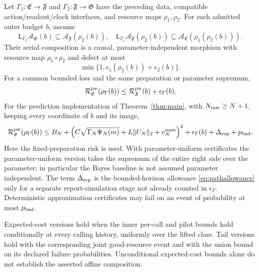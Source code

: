 \begin{theorem}\label{thm:morphism}
Let $\Gamma_1:\mathfrak E\to\mathfrak F$ and $\Gamma_2:\mathfrak F\to\mathfrak G$ have the preceding data, compatible action/readout/clock interfaces, and resource maps $\rho_1,\rho_2$. For each admitted outer budget $b$, assume
\[
 \mathsf L_{\Gamma_2}\mathcal A_{\mathfrak G}(b)
       \subseteq\mathcal A_{\mathfrak F}(\rho_2(b)),
 \quad
 \mathsf L_{\Gamma_1}\mathcal A_{\mathfrak F}(\rho_2(b))
       \subseteq\mathcal A_{\mathfrak E}(\rho_1(\rho_2(b))).
\]
Their serial composition is a causal, parameter-independent morphism with resource map $\rho_1\circ\rho_2$ and defect at most
\[
 \min\{1,\epsilon_1(\rho_2(b))+\epsilon_2(b)\}.
\]
For a common bounded loss and the same preparation or parameter supremum,
\begin{equation}\label{eq:risktransfer}
 \mathcal R^{\rm pw}_{\mathfrak E}(\rho_\Gamma(b))
       \le\mathcal R^{\rm pw}_{\mathfrak F}(b)+\epsilon_\Gamma(b).
\end{equation}
For the prediction implementation of Theorem~\ref{thm:main}, with $N_{\rm raw}\ge N+1$, keeping every coordinate of $b$ and its image,
\begin{equation}\label{eq:joint}
 \mathcal R^{\rm pw}_{\mathfrak E}(\rho_\Gamma(b))
 \le B_N+\left(C\sqrt{\Gamma_N\Psi_N(m)}
       +L\|U_N\|_2+v_N^{\rm num}\right)^2
       +\epsilon_\Gamma(b)+\Delta_{\rm rep}+p_{\rm bad}.
\end{equation}
Here the fixed-preparation risk is used. With parameter-uniform certificates the parameter-uniform version takes the supremum of the entire right side over the parameter; in particular the Bayes baseline is not assumed parameter independent. The term $\Delta_{\rm rep}$ is the bounded-horizon allowance \eqref{eq:pathallowance} only for a separate report-simulation stage not already counted in $\epsilon_\Gamma$. Deterministic approximation certificates may fail on an event of probability at most $p_{\rm bad}$.

Expected-cost versions hold when the inner per-call and pilot bounds hold conditionally at every calling history, uniformly over the lifted class. Tail versions hold with the corresponding joint good-resource event and with the union bound on its declared failure probabilities. Unconditional expected-cost bounds alone do not establish the asserted affine composition.
\end{theorem}
